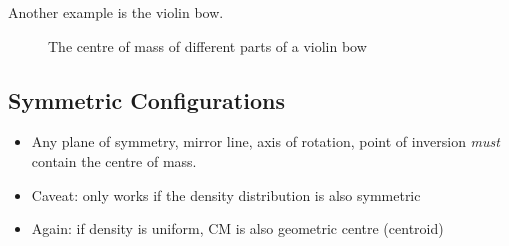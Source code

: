 Another example is the violin bow.
\begin{figure}[ht]
  \centering
  \caption{The centre of mass of different parts of a violin bow}
  \label{fig:violin-bow}
\end{figure}


%
%      


\subsection{Symmetric Configurations}
  \begin{itemize}
  \item Any plane of symmetry, mirror line, axis of rotation, point of inversion
    \emph{must} contain the centre of mass.
  \item Caveat: only works if the density distribution is also symmetric
  \item Again: if density is uniform, CM is also geometric centre (centroid)
  \end{itemize}




